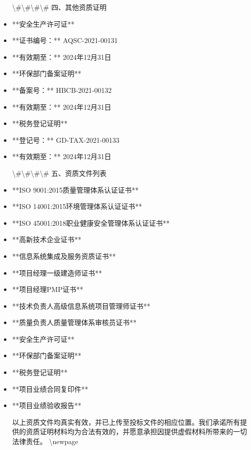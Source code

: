 \documentclass[UTF8,a4paper,zihao=-4]{ctexart}
\begin{document}
\begin{itemize}
\textbackslash{}#\textbackslash{}#\textbackslash{}#\textbackslash{}# 四、其他资质证明

\item **安全生产许可证**
\item **证书编号：** AQSC-2021-00131
\item **有效期至：** 2024年12月31日
\item **环保部门备案证明**
\item **备案号：** HBCB-2021-00132
\item **有效期至：** 2024年12月31日
\item **税务登记证明**
\item **登记号：** GD-TAX-2021-00133
\item **有效期至：** 2024年12月31日

\textbackslash{}#\textbackslash{}#\textbackslash{}#\textbackslash{}# 五、资质文件列表

\item **ISO 9001:2015质量管理体系认证证书**
\item **ISO 14001:2015环境管理体系认证证书**
\item **ISO 45001:2018职业健康安全管理体系认证证书**
\item **高新技术企业证书**
\item **信息系统集成及服务资质证书**
\item **项目经理一级建造师证书**
\item **项目经理PMP证书**
\item **技术负责人高级信息系统项目管理师证书**
\item **质量负责人质量管理体系审核员证书**
\item **安全生产许可证**
\item **环保部门备案证明**
\item **税务登记证明**
\item **项目业绩合同复印件**
\item **项目业绩验收报告**

以上资质文件均真实有效，并已上传至投标文件的相应位置。我们承诺所有提供的资质证明材料均为合法有效的，并愿意承担因提供虚假材料所带来的一切法律责任。
\textbackslash{}newpage

\end{itemize}
\end{document}
